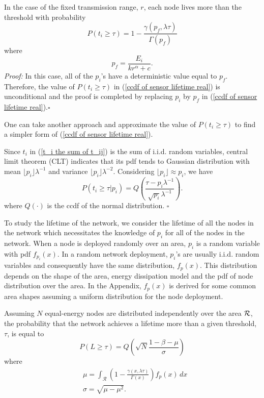 \documentclass[conference]{IEEEtran}
\begin{document}
\corol \label{Corollary fixed power transmission} In the case of the
fixed transmission range, $r$, each node lives more than the
threshold with probability
\begin{equation}\label{Probability fixed transmission}
P(t_i \geq \tau)= 1 - \frac{\gamma (p_f,\lambda \tau)}{\Gamma(p_f)}
\end{equation}
where
\begin{equation}
p_f = \frac{E_i}{k r ^{\alpha} + c}.
\end{equation}
\textit{Proof:} In this case, all of the $p_i$'s have a
deterministic value equal to $p_f$. Therefore, the value of
$P(t_i \geq \tau)$ in (\ref{ccdf of sensor lifetime real}) is unconditional and
the proof is completed by replacing $p_i$ by $p_f$ in (\ref{ccdf of sensor lifetime real}).\hfill $ \square$

One can take another approach and approximate the value of $P(t_i
\geq \tau)$ to find a simpler form of (\ref{ccdf of sensor lifetime
real}).

\prop \label{Propositon Q function} Since $t_i$ in (\ref{t_i the sum of t_ij}) is the sum of i.i.d.
random variables, central limit theorem (CLT)  \cite{Ross_Prob}
indicates that its pdf tends to Gaussian distribution with mean
$\lfloor p_i \rfloor \lambda^{-1}$ and variance $\lfloor p_i \rfloor
\lambda ^{-2}$. Considering $\lfloor p_i \rfloor \approx p_i$, we
have
\begin{equation} \label{s_i Q_function}
P(t_i \geq \tau \vert p_i) = Q\left(\frac{\tau -
p_i\lambda^{-1}}{\sqrt{p_i}\lambda^{-1}}\right).
\end{equation}
where $Q(\cdot)$ is the ccdf of the normal distribution. \hfill $
\square$

To study the lifetime of the network, we consider the lifetime of
all the nodes in the network which necessitates the knowledge of
$p_i$ for all of the nodes in the network. When a node is deployed
randomly over an area, $p_i$ is a random variable with pdf
$f_{p_i}(x)$. In a random network deployment, $p_i$'s are usually
i.i.d. random variables and consequently have the same distribution,
$f_{p}(x)$. This distribution depends on the shape of the area,
energy dissipation model and the pdf of node distribution over the
area. In the Appendix, $f_p(x)$ is derived for some common area
shapes assuming a uniform distribution for the node deployment.

\theo\label{Lifetime theorem} Assuming $N$ equal-energy nodes are
distributed independently over the area $\cal{R}$, the probability
that the network achieves a lifetime more than a given threshold,
$\tau$, is equal to
\begin{equation}\label{Probability Formula}
P(L\geq \tau) = Q \left(\sqrt{N}\frac{1- \beta - \mu}{\sigma}
\right)
\end{equation}
where
\begin{align}\label{Mu Integral relation}
&\mu = \int_{\mathcal{R}} \left (1 - \frac{\gamma (x,\lambda
\tau)}{\Gamma(x)}\right) f_{p}(x)\,dx \\
\label{Mu and Sigma relation} &\sigma = \sqrt{\mu - \mu^2}.
\end{align}
\end{document}
